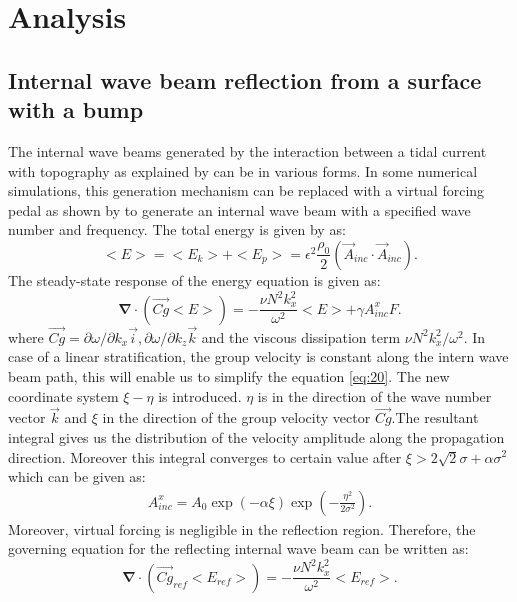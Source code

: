 \documentclass[12pt]{report}
\begin{document}
\chapter{\label{chap:analysis} Analysis}

\section{Internal wave beam reflection from a surface with a bump }
The internal wave beams generated by the interaction between a tidal current with topography as explained by \citet{Kunze} can be in various forms. In some numerical simulations, this generation mechanism can be replaced with a virtual forcing pedal as shown by \citet{Delwiche,Z&D2013} to generate an internal wave beam with a specified wave number and frequency. The total energy is given by \citet{Aksu2017} as:
\begin{equation}
\label{eq:12}
<E>=<E_k>+<E_p>=\epsilon^2\frac{\rho_0}{2}(\vec{A}_{inc}\cdot\vec{A}_{inc}).
\end{equation}
 The steady-state response of the energy equation\cite{Aksu2017} is given as:
\begin{equation}
\label{eq:20}
\mathbf{\nabla}\cdot(\vec{Cg}<E>)=-\frac{\nu N^2k_{x}^2}{\omega^2}<E>+\gamma A_{inc}^{x}F.
\end{equation}
where $\vec{Cg}=\partial \omega / \partial k_x \vec{i},\partial \omega / \partial k_z \vec{k}$ and the viscous dissipation term $\nu N^2k_{x}^2/\omega^2$. In case of a linear stratification, the group velocity is constant along the intern wave beam path, this will enable us to simplify the equation \ref{eq:20}. The new coordinate system $\xi-\eta$ is introduced. $\eta$ is in the direction of the wave number vector $\vec{k}$ and $\xi$ in the direction of the group velocity vector $\vec{Cg}$.The resultant integral gives us the distribution of the velocity amplitude along the propagation direction. Moreover this integral converges to certain value after $\xi > 2\sqrt{2} \sigma+\alpha\sigma^2 $ which can be given as:
\begin{equation}
\begin{split}
A_{inc}^{x}=A_0 \exp(-\alpha\xi)\exp(-\frac{\eta^2}{2\sigma^2}).
\end{split}
\end{equation}
Moreover, virtual forcing is negligible in the reflection region. Therefore, the governing equation for the reflecting internal wave beam can be written as:
\begin{equation}
\label{eq:40}
\mathbf{\nabla}\cdot(\vec{Cg}_{ref}<E_{ref}>)=-\frac{\nu N^2k_{x}^2}{\omega^2}<E_{ref}>.
\end{equation}
\end{document}
